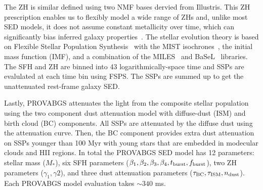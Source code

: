The ZH is similar defined using two NMF bases dervied from Illustris. 
This ZH prescription enables us to flexibly model a wide range of ZHs and,
unlike most SED models, it does not assume constant metallicity over time,
which can significantly bias inferred galaxy properties~\citep{thorne2021}. 
The stellar evolution theory is based on Flexible Stellar Population
Synthesis~\citep[FSPS;][]{conroy2009, conroy2010c} with the MIST
isochrones~\citep{paxton2011, paxton2013, paxton2015, choi2016, dotter2016},  
the \cite{chabrier2003} initial mass function (IMF), and a combination of the
MILES~\citep{sanchez-blazquez2006} and BaSeL~\citep{lejeune1997, lejeune1998,
westera2002} libraries.
The SFH and ZH are binned into 43 logarithmically-space time and SSPs are
evalulated at each time bin using FSPS. 
The SSPs are summed up to get the unattenuated rest-frame galaxy SED. 

Lastly, PROVABGS attenuates the light from the composite stellar population
using the two component \cite{charlot2000} dust attenuation model with
diffuse-dust (ISM) and birth cloud (BC) components. 
All SSPs are attenuated by the diffuse dust using the \cite{kriek2013}
attenuation curve.
Then, the BC component provides extra dust attenuation on SSPs younger than 100
Myr with young stars that are embedded in modecular clouds and HII regions. 
In total the PROVABGS SED model has 12 parameters: stellar mass ($M_*$),
six SFH parameters ($\beta_1, \beta_2, \beta_3, \beta_4, t_{\rm burst}, f_{\rm
burst}$), two ZH parameters ($\gamma_1, \gamma2$), and three dust attenuation
parameters ($\tau_{\rm BC}, \tau_{\rm ISM}, n_{\rm dust}$). 
Each PROVABGS model evaluation takes ${\sim}340$ ms. 


